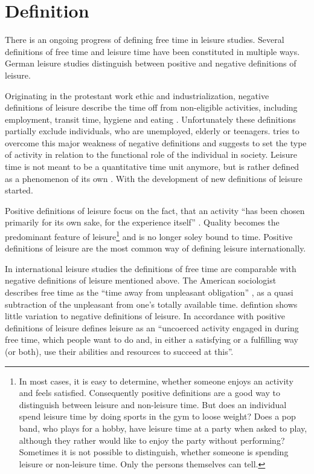 \documentclass[12pt,numbers=noenddot,parskip,bibliography=totocnumbered,listof=totocnumbered,draft=true]{scrreprt}
\begin{document}
\section{Definition}

There is an ongoing progress of defining free time in leisure studies. Several definitions of free time and leisure time have been constituted in multiple ways. German leisure studies distinguish between positive and negative definitions of leisure. 

Originating in the protestant work ethic \citep[p.27]{weber2006} and industrialization, negative definitions of leisure describe the time off from non-eligible activities, including employment, transit time, hygiene and eating \citep[p.137]{prahl2002}. Unfortunately these definitions partially exclude individuals, who are unemployed, elderly or teenagers. \citeauthor{scheuch1972} tries to overcome this major weakness of negative definitions and suggests to set the type of activity in relation to the functional role of the individual in society. Leisure time is not meant to be a quantitative time unit anymore, but is rather defined as a phenomenon of its own \citep[p.31]{scheuch1972}. With \citeauthor{scheuch1972} the development of new definitions of leisure started.

Positive definitions of leisure focus on the fact, that an activity ``has been chosen primarily for its own sake, for the experience itself'' \citep[p.15]{freysinger2000}. Quality becomes the predominant feature of leisure\footnote{In most cases, it is easy to determine, whether someone enjoys an activity and feels satisfied. Consequently positive definitions are a good way to distinguish between leisure and non-leisure time. But does an individual spend leisure time by doing sports in the gym to loose weight? Does a pop band, who plays for a hobby, have leisure time at a party when asked to play, although they rather would like to enjoy the party without performing? Sometimes it is not possible to distinguish, whether someone is spending leisure or non-leisure time. Only the persons themselves can tell.} and is no longer soley bound to time. Positive definitions of leisure are the most common way of defining leisure internationally.

In international leisure studies the definitions of free time are comparable with negative definitions of leisure mentioned above. The American sociologist \citeauthor{stebbins2007} describes free time as the ``time away from unpleasant obligation'' \cite[p.4]{stebbins2007}, as a quasi subtraction of the unpleasant from one's totally available time. \citeauthor{stebbins2007} defintion shows little variation to negative definitions of leisure. In accordance with positive definitions of leisure \citeauthor{stebbins2007} defines leisure as an ``uncoerced  activity engaged in during free time, which people want to do and, in either a satisfying or a fulfilling way (or both), use their abilities and resources to succeed at this''. 
\end{document}
